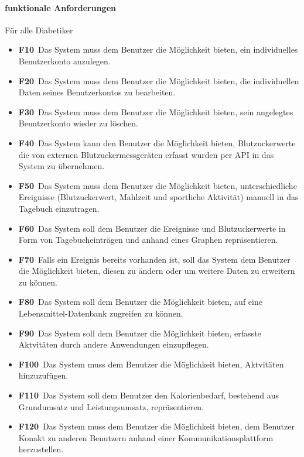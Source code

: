 \documentclass[a4paper,11pt]{article}%
\renewcommand{\\}{\vspace*{0.5\baselineskip} \newline}
\begin{document}
	\paragraph{funktionale Anforderungen}\mbox{}\\
	Für alle Diabetiker
	\begin{itemize}
		\item \lbrack \textbf{F10}\rbrack \ Das System muss dem Benutzer die Möglichkeit bieten, ein individuelles Benutzerkonto anzulegen.
		\item \lbrack \textbf{F20}\rbrack \  Das System muss dem Benutzer die Möglichkeit bieten, die individuellen Daten seines Benutzerkontos zu bearbeiten.
		\item \lbrack \textbf{F30}\rbrack \  Das System muss dem Benutzer die Möglichkeit bieten, sein angelegtes Benutzerkonto wieder zu löschen.
		\item \lbrack \textbf{F40}\rbrack \	Das System kann den Benutzer die Möglichkeit bieten, Blutzuckerwerte die von externen Blutzuckermessgeräten erfasst wurden per API in das System zu übernehmen.
		\item \lbrack \textbf{F50}\rbrack \	Das System muss dem Benutzer die Möglichkeit bieten, unterschiedliche Ereignisse (Blutzuckerwert, Mahlzeit und sportliche Aktivität) manuell in das Tagebuch einzutragen.
		\item \lbrack \textbf{F60}\rbrack \ Das System soll dem Benutzer die Ereignisse und Blutzuckerwerte in Form von Tagebucheinträgen und anhand eines Graphen repräsentieren.
		\item \lbrack \textbf{F70}\rbrack \ Falls ein Ereignis bereits vorhanden ist, soll das System dem Benutzer die Möglichkeit bieten, diesen zu ändern oder um weitere Daten zu erweitern zu können.
		\item \lbrack \textbf{F80}\rbrack \ Das System soll dem Benutzer die Möglichkeit bieten, auf eine Lebensmittel-Datenbank zugreifen zu können.
		\item \lbrack \textbf{F90}\rbrack \ Das System soll dem Benutzer die Möglichkeit bieten, erfasste Aktvitäten durch andere Anwendungen einzupflegen.
		\item \lbrack \textbf{F100}\rbrack \ Das System muss dem Benutzer die Möglichkeit bieten, Aktvitäten hinzuzufügen.
		\item \lbrack \textbf{F110}\rbrack \ Das System soll dem Benutzer den Kalorienbedarf, bestehend aus Grundumsatz und Leistungsumsatz, repräsentieren.
		\item \lbrack \textbf{F120}\rbrack \ Das System muss dem Benutzer die Möglichkeit bieten, dem Benutzer Konakt zu anderen Benutzern anhand einer Kommunikationsplattform herzustellen.

\end{itemize}
\end{document}
